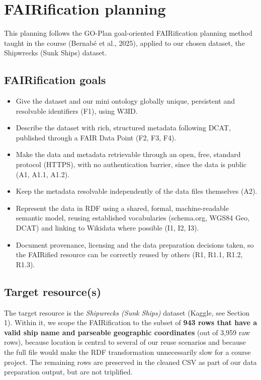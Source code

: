 
\section{FAIRification planning}

This planning follows the GO-Plan goal-oriented FAIRification planning method taught in the course (Bernab\'e et al., 2025), applied to our chosen dataset, the Shipwrecks (Sunk Ships) dataset.

\subsection{FAIRification goals}
\begin{itemize}
    \item Give the dataset and our mini ontology globally unique, persistent and resolvable identifiers (F1), using W3ID.
    \item Describe the dataset with rich, structured metadata following DCAT, published through a FAIR Data Point (F2, F3, F4).
    \item Make the data and metadata retrievable through an open, free, standard protocol (HTTPS), with no authentication barrier, since the data is public (A1, A1.1, A1.2).
    \item Keep the metadata resolvable independently of the data files themselves (A2).
    \item Represent the data in RDF using a shared, formal, machine-readable semantic model, reusing established vocabularies (schema.org, WGS84 Geo, DCAT) and linking to Wikidata where possible (I1, I2, I3).
    \item Document provenance, licensing and the data preparation decisions taken, so the FAIRified resource can be correctly reused by others (R1, R1.1, R1.2, R1.3).
\end{itemize}

\subsection{Target resource(s)}
The target resource is the \emph{Shipwrecks (Sunk Ships)} dataset (Kaggle, see Section 1). Within it, we scope the FAIRification to the subset of \textbf{943 rows that have a valid ship name and parseable geographic coordinates} (out of 3,959 raw rows), because location is central to several of our reuse scenarios and because the full file would make the RDF transformation unnecessarily slow for a course project. The remaining rows are preserved in the cleaned CSV as part of our data preparation output, but are not triplified.


